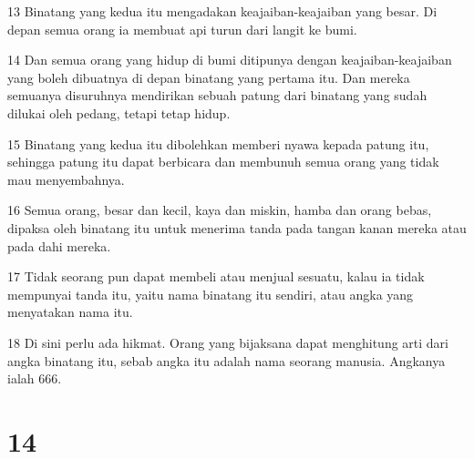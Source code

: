 \par 13 Binatang yang kedua itu mengadakan keajaiban-keajaiban yang besar. Di depan semua orang ia membuat api turun dari langit ke bumi.
\par 14 Dan semua orang yang hidup di bumi ditipunya dengan keajaiban-keajaiban yang boleh dibuatnya di depan binatang yang pertama itu. Dan mereka semuanya disuruhnya mendirikan sebuah patung dari binatang yang sudah dilukai oleh pedang, tetapi tetap hidup.
\par 15 Binatang yang kedua itu dibolehkan memberi nyawa kepada patung itu, sehingga patung itu dapat berbicara dan membunuh semua orang yang tidak mau menyembahnya.
\par 16 Semua orang, besar dan kecil, kaya dan miskin, hamba dan orang bebas, dipaksa oleh binatang itu untuk menerima tanda pada tangan kanan mereka atau pada dahi mereka.
\par 17 Tidak seorang pun dapat membeli atau menjual sesuatu, kalau ia tidak mempunyai tanda itu, yaitu nama binatang itu sendiri, atau angka yang menyatakan nama itu.
\par 18 Di sini perlu ada hikmat. Orang yang bijaksana dapat menghitung arti dari angka binatang itu, sebab angka itu adalah nama seorang manusia. Angkanya ialah 666.

\chapter{14}

